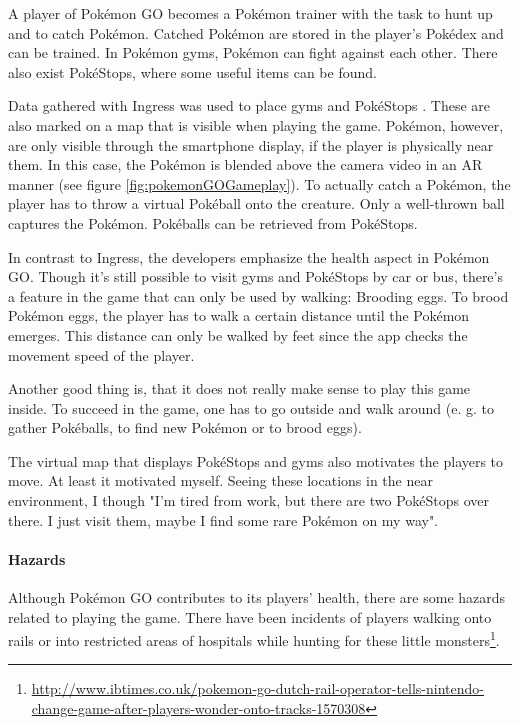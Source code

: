 A player of Pok\'{e}mon GO becomes a Pok\'{e}mon trainer with the task to hunt up and to catch Pok\'{e}mon. Catched Pok\'{e}mon are stored in the player's Pok\'{e}dex and can be trained. In Pok\'{e}mon gyms, Pok\'{e}mon can fight against each other. There also exist Pok\'{e}Stops, where some useful items can be found.

Data gathered with Ingress was used to place gyms and Pok\'{e}Stops \citep{Ingress}. These are also marked on a map that is visible when playing the game. Pok\'{e}mon, however, are only visible through the smartphone display, if the player is physically near them. In this case, the Pok\'{e}mon is blended above the camera video in an AR manner (see figure \ref{fig:pokemonGOGameplay}).
To actually catch a Pok\'{e}mon, the player has to throw a virtual Pok\'{e}ball onto the creature. Only a well-thrown ball captures the Pok\'{e}mon. Pok\'{e}balls can be retrieved from Pok\'{e}Stops.

In contrast to Ingress, the developers emphasize the health aspect in Pok\'{e}mon GO. Though it's still possible to visit gyms and Pok\'{e}Stops by car or bus, there's a feature in the game that can only be used by walking: Brooding eggs. To brood Pok\'{e}mon eggs, the player has to walk a certain distance until the Pok\'{e}mon emerges. This distance can only be walked by feet since the app checks the movement speed of the player.

Another good thing is, that it does not really make sense to play this game inside. To succeed in the game, one has to go outside and walk around (e. g. to gather Pok\'{e}balls, to find new Pok\'{e}mon or to brood eggs).

The virtual map that displays Pok\'{e}Stops and gyms also motivates the players to move. At least it motivated myself. Seeing these locations in the near environment, I though "I'm tired from work, but there are two Pok\'{e}Stops over there. I just visit them, maybe I find some rare Pok\'{e}mon on my way".

\paragraph{Hazards}
Although Pok\'{e}mon GO contributes to its players' health, there are some hazards related to playing the game. There have been incidents of players walking onto rails or into restricted areas of hospitals while hunting for these little monsters\footnote{\url{http://www.ibtimes.co.uk/pokemon-go-dutch-rail-operator-tells-nintendo-change-game-after-players-wonder-onto-tracks-1570308}}.

